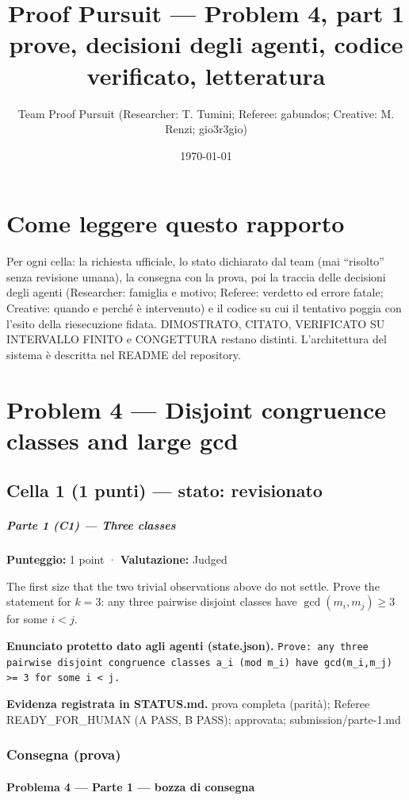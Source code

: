 \documentclass[11pt,a4paper]{article}
\title{Proof Pursuit --- Problem 4, part 1\\ \large prove, decisioni degli agenti, codice verificato, letteratura}
\author{Team Proof Pursuit (Researcher: T. Tumini; Referee: gabundos; Creative: M. Renzi; gio3r3gio)}
\date{\today}
\begin{document}
\maketitle\tableofcontents
\section*{Come leggere questo rapporto}
Per ogni cella: la richiesta ufficiale, lo stato dichiarato dal team (mai ``risolto'' senza revisione umana), la consegna
con la prova, poi la traccia delle decisioni degli agenti (Researcher: famiglia e motivo; Referee: verdetto ed errore
fatale; Creative: quando e perché è intervenuto) e il codice su cui il tentativo poggia con l'esito della riesecuzione
fidata. DIMOSTRATO, CITATO, VERIFICATO SU INTERVALLO FINITO e CONGETTURA restano distinti. L'architettura del sistema
è descritta nel README del repository.
\section{Problem 4 — Disjoint congruence classes and large gcd}
\subsection{Cella 1 (1 punti) — stato: revisionato}
\subparagraph{Parte 1 (C1) --- Three
classes}\label{parte-1-c1-three-classes}

\textbf{Punteggio:} 1 point · \textbf{Valutazione:} Judged

The first size that the two trivial observations above do not settle.
Prove the statement for \(k = 3\): any three pairwise disjoint classes
have \(\gcd(m_i, m_j) \ge 3\) for some \(i < j\).

\textbf{Enunciato protetto dato agli agenti (state.json).} \texttt{Prove: any three pairwise disjoint congruence classes a\_i (mod m\_i) have gcd(m\_i,m\_j) \textgreater{}= 3 for some i \textless{} j.}

\textbf{Evidenza registrata in STATUS.md.} prova completa (parità); Referee READY\_FOR\_HUMAN (A PASS, B PASS); approvata; submission/parte-1.md

\subsubsection{Consegna (prova)}
\paragraph{Problema 4 --- Parte 1 --- bozza di
consegna}\label{problema-4-parte-1-bozza-di-consegna}
\end{document}
